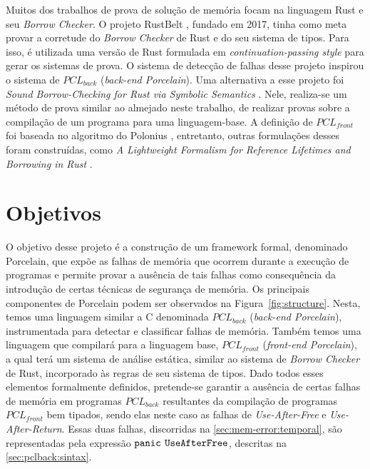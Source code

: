 Muitos dos trabalhos de prova de solução de memória focam na linguagem Rust e seu \emph{Borrow Checker}. O projeto RustBelt \cite{RUSTBELT}, fundado em 2017, tinha como meta provar a corretude do \emph{Borrow Checker} de Rust e do seu sistema de tipos. Para isso, é utilizada uma versão de Rust formulada em \emph{continuation-passing style} para gerar os sistemas de prova. O sistema de detecção de falhas desse projeto inspirou o sistema de $PCL_{back}$ (\emph{back-end Porcelain}). Uma alternativa a esse projeto foi \emph{Sound Borrow-Checking for Rust via Symbolic Semantics} \cite{RUSTSYMBOLIC}. Nele, realiza-se um método de prova similar ao almejado neste trabalho, de realizar provas sobre a compilação de um programa para uma linguagem-base. A definição de $PCL_{front}$ foi baseada no algoritmo do Polonius \cite{Stjerna1684081}, entretanto, outras formulações desses foram construídas, como \emph{A Lightweight Formalism for Reference Lifetimes and Borrowing in Rust} \cite{RUSTFORMALISM}. 


\section{Objetivos}

O objetivo desse projeto é a construção de um framework formal, denominado Porcelain, que expõe as falhas de memória que ocorrem durante a execução de programas e permite provar a ausência de tais falhas como consequência da introdução de certas técnicas de segurança de memória. Os principais componentes de Porcelain podem ser observados na Figura~\ref{fig:structure}. Nesta, temos uma linguagem similar a C denominada $PCL_{back}$ (\emph{back-end Porcelain}), instrumentada para detectar e classificar falhas de memória. Também temos uma linguagem que compilará para a linguagem base, $PCL_{front}$ (\emph{front-end Porcelain}), a qual terá um sistema de análise estática, similar ao sistema de \emph{Borrow Checker} de Rust, incorporado às regras de seu sistema de tipos. Dado todos esses elementos formalmente definidos, pretende-se garantir a ausência de certas falhas de memória em programas $PCL_{back}$ resultantes da compilação de programas $PCL_{front}$ bem tipados, sendo elas neste caso as falhas de \emph{Use-After-Free} e \emph{Use-After-Return}. Essas duas falhas, discorridas na \autoref{sec:mem-error:temporal}, são representadas pela expressão $\texttt{panic}$ $\texttt{UseAfterFree}$, descritas na \autoref{sec:pclback:sintax}.

